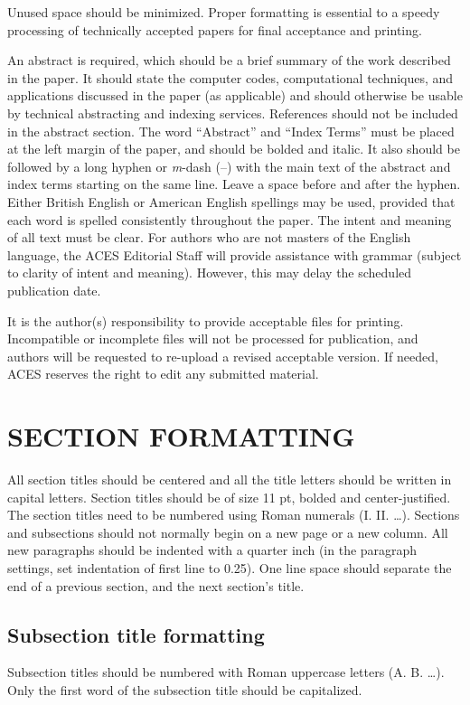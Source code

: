 \documentclass[letterpaper,twocolumn]{ACESJournal}
\newcommand{\red}[1]{{\color{red}#1}}
\begin{document}
Unused space should be minimized. Proper formatting is essential to a speedy processing of technically accepted papers for final acceptance and printing.

An abstract is required, which should be a brief summary of the work described in the paper. It should state the computer codes, computational techniques, and applications discussed in the paper (as applicable) and should otherwise be usable by technical abstracting and indexing services. \red{References should not be included in the abstract section.} The word ``Abstract'' and ``Index Terms'' must be placed at the left margin of the paper, and should be \red{bolded} and \red{italic}. It also should be followed by a long hyphen or \textit{m}-dash (--) with the main text of the abstract and index terms starting on the same line. \red{Leave a space before and after the hyphen.} Either British English or American English spellings may be used, provided that each word is spelled consistently throughout the paper. The intent and meaning of all text must be clear. For authors who are not masters of the English language, the ACES Editorial Staff will provide assistance with grammar (subject to clarity of intent and meaning). However, this may delay the scheduled publication date.

It is the author(s) responsibility to provide acceptable files for printing. Incompatible or incomplete files will not be processed for publication, and authors will be requested to re-upload a revised acceptable version. If needed, ACES reserves the right to edit any submitted material.
%
\section{SECTION FORMATTING}
%
All section titles should be centered and all the title letters should be written in capital letters. \red{Section titles should be of size 11 pt, bolded and center-justified.} The section titles need to be numbered using Roman numerals (I. II. \ldots). Sections and subsections should not normally begin on a new page or a new column. All new paragraphs should be indented with a quarter inch (in the paragraph settings, set indentation of first line to 0.25). One line space should separate the end of a previous section, and the next section's title.
%
\subsection{Subsection title formatting}
%
Subsection titles should be numbered with Roman uppercase letters (A. B. \ldots). Only the first word of the subsection title should be capitalized.
%
\end{document}
